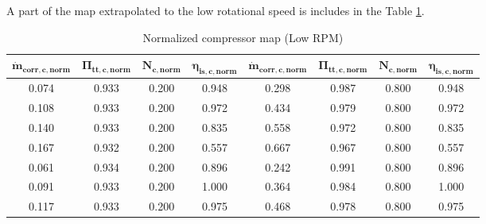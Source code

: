 A part of the map extrapolated to the low rotational speed is includes in the Table \ref{tab:C7_compmap_LRPM}. 
\begin{longtable}[c]{@{}cccc|cccc@{}}
\caption{Normalized compressor map (Low RPM)}
\label{tab:C7_compmap_LRPM}\\
\toprule
$\mathbf{\dot{m}_{corr,c,norm}}$ & $\mathbf{\Pi_{tt,c,norm}}$ & $\mathbf{N_{c,norm}}$ & $\mathbf{\eta_{is,c,norm}}$ & $\mathbf{\dot{m}_{corr,c,norm}}$ & $\mathbf{\Pi_{tt,c,norm}}$ & $\mathbf{N_{c,norm}}$ & $\mathbf{\eta_{is,c,norm}}$ \\* \midrule
\endfirsthead
%
\endhead
%
\bottomrule
\endfoot
%
\endlastfoot
%
0.074                            & 0.933                      & 0.200                 & 0.948                       & 0.298                            & 0.987                      & 0.800                 & 0.948                       \\
0.108                            & 0.933                      & 0.200                 & 0.972                       & 0.434                            & 0.979                      & 0.800                 & 0.972                       \\
0.140                            & 0.933                      & 0.200                 & 0.835                       & 0.558                            & 0.972                      & 0.800                 & 0.835                       \\
0.167                            & 0.932                      & 0.200                 & 0.557                       & 0.667                            & 0.967                      & 0.800                 & 0.557                       \\
0.061                            & 0.934                      & 0.200                 & 0.896                       & 0.242                            & 0.991                      & 0.800                 & 0.896                       \\
0.091                            & 0.933                      & 0.200                 & 1.000                       & 0.364                            & 0.984                      & 0.800                 & 1.000                       \\
0.117                            & 0.933                      & 0.200                 & 0.975                       & 0.468                            & 0.978                      & 0.800                 & 0.975                       \\

\end{longtable}
